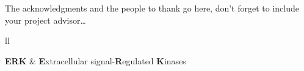 \documentclass[
11pt, %
english, %
singlespacing, %
headsepline, %
]{MastersDoctoralThesis} %
\begin{document}

\begin{acknowledgements}
\addchaptertocentry{\acknowledgementname} %
The acknowledgments and the people to thank go here, don't forget to include your project advisor\ldots
\end{acknowledgements}


{
  \hypersetup{linkcolor=black} %
  \tableofcontents %
  \listoffigures %
  \listoftables %
}


\begin{abbreviations}{ll} %

\textbf{ERK} & \textbf{E}xtracellular signal-\textbf{R}egulated \textbf{K}inases\\

\end{abbreviations}


\mainmatter %

\pagestyle{thesis} %


\end{document}
